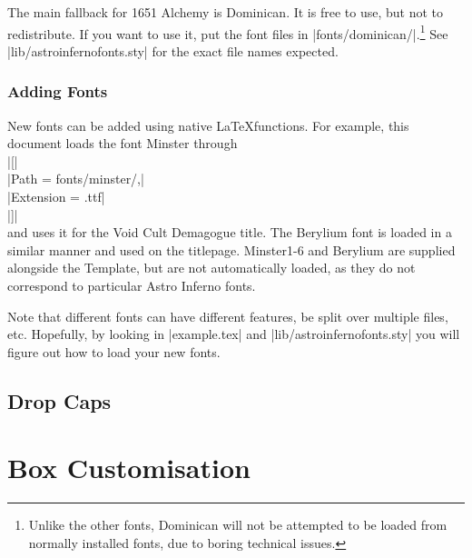\documentclass[letterpaper,twocolumn,openany,nodeprecatedcode]{astroinfernobook}
\begin{document}
The main fallback for 1651 Alchemy is Dominican. It is free to use,
but not to redistribute. If you want to use it, put the font files in
|fonts/dominican/|.\footnote{Unlike the other fonts, Dominican will not be
attempted to be loaded from normally installed fonts, due to boring
technical issues.}
See |lib/astroinfernofonts.sty| for the exact file
names expected.

\newpage %
\subsection{Adding Fonts}
New fonts can be added using native \LaTeX functions.
For example, this document loads the font Minster through\\[\baselineskip]
|\newfontfamily{}[|\\
|Path = fonts/minster/,|\\
|Extension = .ttf|\\
|]|\\[\baselineskip]
and uses it for the Void Cult Demagogue title.
The Berylium font is loaded in a similar manner and used on the titlepage.
Minster1-6 and Berylium are supplied alongside the Template,
but are not automatically loaded, as they do not correspond to particular
Astro Inferno fonts.

Note that different fonts can have different features, be split over multiple files, etc.
Hopefully, by looking in |example.tex| and |lib/astroinfernofonts.sty| you will
figure out how to load your new fonts.

\section{Drop Caps}

\AINextChapterBefore[2.5cm]{} %
\AINextChapterAfter{\normalsize \vspace{1cm}}
\chapter{Box Customisation} \label{ch:box_customisation}
\end{document}
